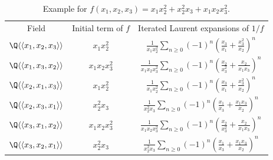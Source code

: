 \documentclass[11pt,e-only]{amsart}
\begin{document}
\begin{table}[]
    \centering
    \begin{tabular}{c|c|c}
        Field & Initial term of $f$ & Iterated Laurent expansions of $1/f$ \\
        $\Q\langle\langle x_1,x_2,x_3\rangle\rangle$ & $x_1x_2^2$ & $\frac{1}{x_1x_2^2} \sum_{n\geq 0}(-1)^n\left(\frac{x_3}{x_1}+\frac{x_3^2}{x_2}\right)^n$ \\
        $\Q\langle\langle x_1,x_3,x_2\rangle\rangle$ & $x_1x_2x_3^2$ & $\frac{1}{x_1x_2x_3^2} \sum_{n\geq 0}(-1)^n\left(\frac{x_2}{x_3^2}+\frac{x_2}{x_1x_3}\right)^n$ \\
        $\Q\langle\langle x_2,x_1,x_3\rangle\rangle$ & $x_1x_2^2$ & $\frac{1}{x_1x_2^2} \sum_{n\geq 0}(-1)^n\left(\frac{x_3}{x_1}+\frac{x_3^2}{x_2}\right)^n$ \\
        $\Q\langle\langle x_2,x_3,x_1\rangle\rangle$ & $x_2^2x_3$ & $\frac{1}{x_2^2x_3} \sum_{n\geq 0}(-1)^n\left(\frac{x_1}{x_3}+\frac{x_1x_3}{x_2}\right)^n$ \\
        $\Q\langle\langle x_3,x_1,x_2\rangle\rangle$ & $x_1x_2x_3^2$ & $\frac{1}{x_1x_2x_3^2} \sum_{n\geq 0}(-1)^n\left(\frac{x_2}{x_3^2}+\frac{x_2}{x_1x_3}\right)^n$ \\
        $\Q\langle\langle x_3,x_2,x_1\rangle\rangle$ & $x_2^2x_3$ & $\frac{1}{x_2^2x_3} \sum_{n\geq 0}(-1)^n\left(\frac{x_1}{x_3}+\frac{x_1x_3}{x_2}\right)^n$ \\
    \end{tabular}
    \caption{Example for $f(x_1,x_2,x_3)=x_1x_2^2+x_2^2x_3+x_1x_2x_3^2$.}
    \label{tab:ex:inverse-3-vars}
\end{table}

\end{document}
